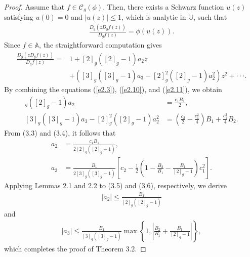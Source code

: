 \documentclass[11pt,twoside, reqno]{article}
\theoremstyle{definition}
\begin{document}
\begin{proof}
Assume that $f\in\mathcal{C}_{g}(\phi)$. Then, there exists a Schwarz function $u(z)$ satisfying $u(0) = 0$ and $|u(z)| \leq 1$, which is analytic in $\mathbb{U}$, such that
\begin{align}\label{e2.10}
\frac{D_{g}(zD_{g}f(z))}{D_{g}f(z)}=\phi(u(z)).
\end{align}
Since $f\in \mathbb{A} $, the straightforward computation gives	
\begin{align}\label{e2.11}\nonumber
\frac{D_{g}(zD_{g}f(z))}{D_{g}f(z)}=&1+[2]_{g}\left([2]_{g}-1\right)a_{2}z\\
&+\left([3]_{g}([3]_{g}-1)a_{3}-[2]_{g}^{2}([2]_{g}-1)a_{2}^{2}\right)z^{2}+\cdot\cdot\cdot.
\end{align}
By combining the equations (\ref{e2.3}), (\ref{e2.10}), and (\ref{e2.11}), we obtain
\begin{align}
[2]_{g}\left([2]_{g}-1\right)a_{2} &= \frac{c_{1}B_{1}}{2}, \\
[3]_{g}([3]_{g}-1)a_{3}-[2]_{g}^{2}([2]_{g}-1)a_{2}^{2} &= \left(\frac{c_{2}}{2}-\frac{c_{1}^{2}}{4}\right)B_{1}+\frac{c_{1}^{2}}{4}B_{2}.
\end{align}
From (3.3) and (3.4), it follows that
\begin{align}
a_{2} &= \frac{c_1B_{1}}{2[2]_{g}([2]_{g}-1)}, \\
a_{3} &= \frac{B_{1}}{2[3]_{g}([3]_{g}-1)}\left[c_{2}-\frac{1}{2}\left(1-\frac{B_{2}}{B_{1}}-\frac{B_{1}}{[2]_{g}-1}\right)c_{1}^{2}\right].
\end{align}
Applying Lemmas 2.1 and 2.2 to (3.5) and (3.6), respectively, we derive
\begin{align}
\mid a_{2}\mid \leq \frac{B_{1}}{[2]_{g}([2]_{g}-1)}\nonumber
\end{align}
and
\begin{align}\nonumber
\mid a_{3}\mid \leq\frac{B_{1}}{[3]_{g}([3]_{g}-1)}\max\left\{1, \left|\frac{B_{2}}{B_{1}}+\frac{B_{1}}{[2]_{g}-1}\right|\right\},\nonumber
\end{align}
which completes the proof of Theorem 3.2.
\end{proof}
\end{document}

